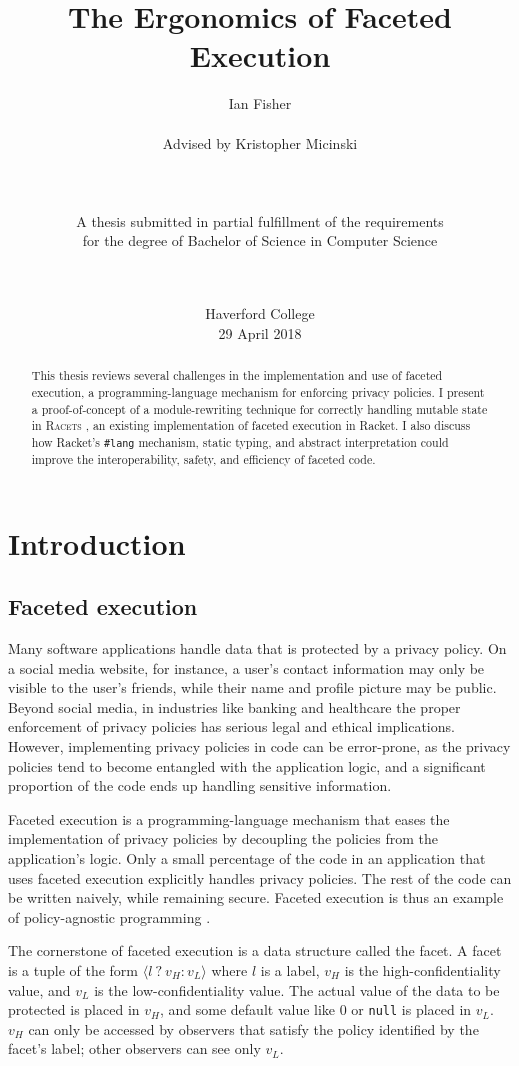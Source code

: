 \documentclass{article}
\title{The Ergonomics of Faceted Execution}
\author{Ian Fisher \\ \\ Advised by Kristopher Micinski \\ \\ \\ \\ A thesis submitted in partial fulfillment of the requirements \\ for the degree of Bachelor of Science in Computer Science \\ \\ \\}
\date{Haverford College \\ 29 April 2018}
\begin{document}
\maketitle

\begin{abstract}
	This thesis reviews several challenges in the implementation and use of faceted execution, a programming-language mechanism for enforcing privacy policies. I present a proof-of-concept of a module-rewriting technique for correctly handling mutable state in \textsc{Racets} \cite{racets}, an existing implementation of faceted execution in Racket. I also discuss how Racket's \texttt{\#lang} mechanism, static typing, and abstract interpretation could improve the interoperability, safety, and efficiency of faceted code.
\end{abstract}

\newpage
\tableofcontents
\newpage



\section{Introduction\label{sec:intro}}
\subsection{Faceted execution\label{sec:facets}}
Many software applications handle data that is protected by a privacy policy. On a social media website, for instance, a user's contact information may only be visible to the user's friends, while their name and profile picture may be public. Beyond social media, in industries like banking and healthcare the proper enforcement of privacy policies has serious legal and ethical implications. However, implementing privacy policies in code can be error-prone, as the privacy policies tend to become entangled with the application logic, and a significant proportion of the code ends up handling sensitive information.

Faceted execution is a programming-language mechanism that eases the implementation of privacy policies by decoupling the policies from the application's logic. Only a small percentage of the code in an application that uses faceted execution explicitly handles privacy policies. The rest of the code can be written naively, while remaining secure. Faceted execution is thus an example of policy-agnostic programming \cite{faceted}.

The cornerstone of faceted execution is a data structure called the facet. A facet is a tuple of the form $\langle l\ ?\ v_H : v_L \rangle$ where $l$ is a label, $v_H$ is the high-confidentiality value, and $v_L$ is the low-confidentiality value. The actual value of the data to be protected is placed in $v_H$, and some default value like $0$ or \texttt{null} is placed in $v_L$. $v_H$ can only be accessed by observers that satisfy the policy identified by the facet's label; other observers can see only $v_L$.
\end{document}

